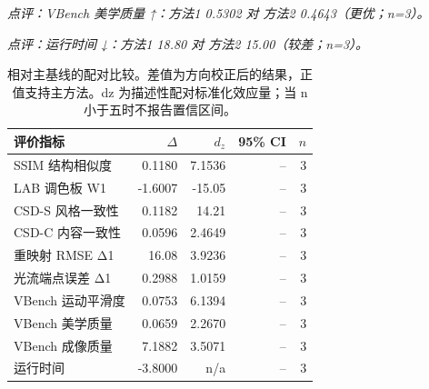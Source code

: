 \documentclass[UTF8,10pt]{ctexart}
\begin{document}
\noindent\textit{点评：VBench 美学质量 ↑：方法1 0.5302 对 方法2 0.4643（更优；n=3）。}
\begin{table}[H]
\centering
\caption{计算成本结果。表中为有效配对片段上的均值和样本标准差。最优和次优均值分别以粗体和下划线标出。箭头表示指标偏好方向。有效片段数：balanced: 3; flicker: 3; overlay: 3。}
\label{tab:metrics-5}
\small
{}
\end{table}
\noindent\textit{点评：运行时间 ↓：方法1 18.80 对 方法2 15.00（较差；n=3）。}
\begin{table}[H]
\centering
\caption{相对主基线的配对比较。差值为方向校正后的结果，正值支持主方法。dz 为描述性配对标准化效应量；当 n 小于五时不报告置信区间。}
\label{tab:paired-effects}
\small
\begin{tabular}{@{}lrrrr@{}}
\toprule
评价指标 & $\Delta$ & $d_z$ & 95\% CI & $n$ \\
\midrule
SSIM 结构相似度 & 0.1180 & 7.1536 & -- & 3 \\
LAB 调色板 W1 & -1.6007 & -15.05 & -- & 3 \\
CSD-S 风格一致性 & 0.1182 & 14.21 & -- & 3 \\
CSD-C 内容一致性 & 0.0596 & 2.4649 & -- & 3 \\
重映射 RMSE Δ1 & 16.08 & 3.9236 & -- & 3 \\
光流端点误差 Δ1 & 0.2988 & 1.0159 & -- & 3 \\
VBench 运动平滑度 & 0.0753 & 6.1394 & -- & 3 \\
VBench 美学质量 & 0.0659 & 2.2670 & -- & 3 \\
VBench 成像质量 & 7.1882 & 3.5071 & -- & 3 \\
运行时间 & -3.8000 & n/a & -- & 3 \\
\bottomrule
\end{tabular}
\end{table}
\end{document}
